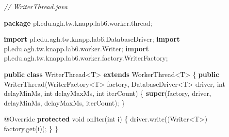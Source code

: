 \documentclass[11pt]{article}
\newenvironment{Shaded}{}{}
\newcommand{\KeywordTok}[1]{\textcolor[rgb]{0.00,0.44,0.13}{\textbf{{#1}}}}
\newcommand{\DataTypeTok}[1]{\textcolor[rgb]{0.56,0.13,0.00}{{#1}}}
\newcommand{\CommentTok}[1]{\textcolor[rgb]{0.38,0.63,0.69}{\textit{{#1}}}}
\newcommand{\FunctionTok}[1]{\textcolor[rgb]{0.02,0.16,0.49}{{#1}}}
\newcommand{\NormalTok}[1]{{#1}}
\newcommand{\ImportTok}[1]{{#1}}
\newcommand{\OperatorTok}[1]{\textcolor[rgb]{0.40,0.40,0.40}{{#1}}}
\newcommand{\BuiltInTok}[1]{{#1}}
\newcommand{\AttributeTok}[1]{\textcolor[rgb]{0.49,0.56,0.16}{{#1}}}
\begin{document}
\begin{Shaded}
\begin{Highlighting}[]
\CommentTok{// WriterThread.java}

\KeywordTok{package}\ImportTok{ pl}\OperatorTok{.}\ImportTok{edu}\OperatorTok{.}\ImportTok{agh}\OperatorTok{.}\ImportTok{tw}\OperatorTok{.}\ImportTok{knapp}\OperatorTok{.}\ImportTok{lab6}\OperatorTok{.}\ImportTok{worker}\OperatorTok{.}\ImportTok{thread}\OperatorTok{;}

\KeywordTok{import} \ImportTok{pl}\OperatorTok{.}\ImportTok{edu}\OperatorTok{.}\ImportTok{agh}\OperatorTok{.}\ImportTok{tw}\OperatorTok{.}\ImportTok{knapp}\OperatorTok{.}\ImportTok{lab6}\OperatorTok{.}\ImportTok{DatabaseDriver}\OperatorTok{;}
\KeywordTok{import} \ImportTok{pl}\OperatorTok{.}\ImportTok{edu}\OperatorTok{.}\ImportTok{agh}\OperatorTok{.}\ImportTok{tw}\OperatorTok{.}\ImportTok{knapp}\OperatorTok{.}\ImportTok{lab6}\OperatorTok{.}\ImportTok{worker}\OperatorTok{.}\ImportTok{Writer}\OperatorTok{;}
\KeywordTok{import} \ImportTok{pl}\OperatorTok{.}\ImportTok{edu}\OperatorTok{.}\ImportTok{agh}\OperatorTok{.}\ImportTok{tw}\OperatorTok{.}\ImportTok{knapp}\OperatorTok{.}\ImportTok{lab6}\OperatorTok{.}\ImportTok{worker}\OperatorTok{.}\ImportTok{factory}\OperatorTok{.}\ImportTok{WriterFactory}\OperatorTok{;}

\KeywordTok{public} \KeywordTok{class}\NormalTok{ WriterThread}\OperatorTok{\textless{}}\NormalTok{T}\OperatorTok{\textgreater{}} \KeywordTok{extends}\NormalTok{ WorkerThread}\OperatorTok{\textless{}}\NormalTok{T}\OperatorTok{\textgreater{}} \OperatorTok{\{}
    \KeywordTok{public} \FunctionTok{WriterThread}\OperatorTok{(}\NormalTok{WriterFactory}\OperatorTok{\textless{}}\NormalTok{T}\OperatorTok{\textgreater{}}\NormalTok{ factory}\OperatorTok{,}\NormalTok{ DatabaseDriver}\OperatorTok{\textless{}}\NormalTok{T}\OperatorTok{\textgreater{}}\NormalTok{ driver}\OperatorTok{,}
                        \DataTypeTok{int}\NormalTok{ delayMinMs}\OperatorTok{,} \DataTypeTok{int}\NormalTok{ delayMaxMs}\OperatorTok{,} \DataTypeTok{int}\NormalTok{ iterCount}\OperatorTok{)}
    \OperatorTok{\{}
        \KeywordTok{super}\OperatorTok{(}\NormalTok{factory}\OperatorTok{,}\NormalTok{ driver}\OperatorTok{,}\NormalTok{ delayMinMs}\OperatorTok{,}\NormalTok{ delayMaxMs}\OperatorTok{,}\NormalTok{ iterCount}\OperatorTok{);}
    \OperatorTok{\}}

    \AttributeTok{@Override}
    \KeywordTok{protected} \DataTypeTok{void} \FunctionTok{onIter}\OperatorTok{(}\DataTypeTok{int}\NormalTok{ i}\OperatorTok{)} \OperatorTok{\{}
\NormalTok{        driver}\OperatorTok{.}\FunctionTok{write}\OperatorTok{((}\BuiltInTok{Writer}\OperatorTok{\textless{}}\NormalTok{T}\OperatorTok{\textgreater{})}\NormalTok{ factory}\OperatorTok{.}\FunctionTok{get}\OperatorTok{(}\NormalTok{i}\OperatorTok{));}
    \OperatorTok{\}}
\OperatorTok{\}}
\end{Highlighting}
\end{Shaded}
\end{document}
